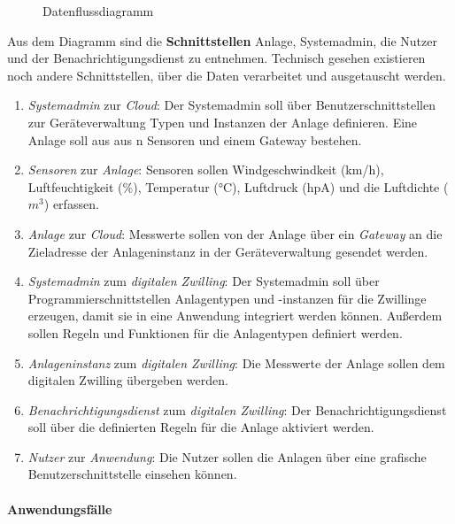 \begin{figure}[ht!]
  \centering
  \noindent{}
  \caption[Datenflussdiagramm]{Datenflussdiagramm}
  \label{dataflow}
\end{figure}

\noindent Aus dem Diagramm sind die \textbf{Schnittstellen} Anlage, Systemadmin, die Nutzer und der Benachrichtigungsdienst zu entnehmen. Technisch gesehen existieren noch andere Schnittstellen, über die Daten verarbeitet und ausgetauscht werden.

\begin{enumerate}
  \item \textit{Systemadmin} zur \textit{Cloud}: Der Systemadmin soll über Benutzerschnittstellen zur Geräteverwaltung Typen und Instanzen der Anlage definieren. Eine Anlage soll aus aus n Sensoren und einem Gateway bestehen.
  \item \textit{Sensoren} zur \textit{Anlage}: Sensoren sollen Windgeschwindkeit (km/h), Luftfeuchtigkeit (\%), Temperatur (°C), Luftdruck (hpA) und die Luftdichte ($m^3$) erfassen.
  \item \textit{Anlage} zur \textit{Cloud}: Messwerte sollen von der Anlage über ein \textit{Gateway} an die Zieladresse der Anlageninstanz in der Geräteverwaltung gesendet werden.
  \item \textit{Systemadmin} zum \textit{digitalen Zwilling}: Der Systemadmin soll über Programmierschnittstellen Anlagentypen und -instanzen für die Zwillinge erzeugen, damit sie in eine Anwendung integriert werden können. Außerdem sollen Regeln und Funktionen für die Anlagentypen definiert werden.
  \item \textit{Anlageninstanz} zum \textit{digitalen Zwilling}: Die Messwerte der Anlage sollen dem digitalen Zwilling übergeben werden.
  \item \textit{Benachrichtigungsdienst} zum \textit{digitalen Zwilling}: Der Benachrichtigungsdienst soll über die definierten Regeln für die Anlage aktiviert werden.
  \item \textit{Nutzer} zur \textit{Anwendung}: Die Nutzer sollen die Anlagen über eine grafische Benutzerschnittstelle einsehen können.
\end{enumerate}

\paragraph{Anwendungsfälle}

